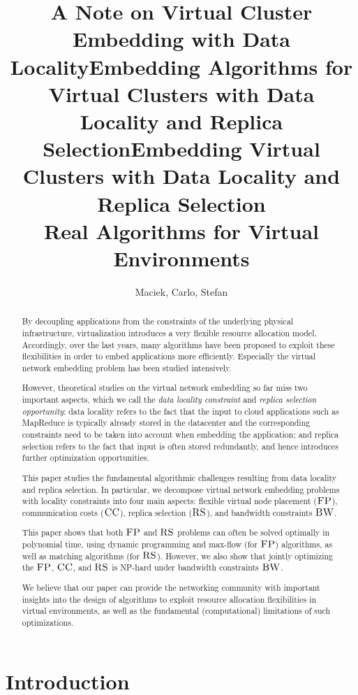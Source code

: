 \documentclass[9pt,twocolumn]{scrartcl}
\title{A Note on Virtual Cluster Embedding with Data Locality}
\title{Embedding Algorithms for Virtual Clusters with Data Locality and Replica Selection}
\title{Embedding Virtual Clusters with Data Locality and Replica Selection\\{\Large Real Algorithms for Virtual Environments}}
\author{Maciek, Carlo, Stefan}
\newcommand{\CC}{\textsc{CC}}
\newcommand{\FP}{\textsc{FP}}
\newcommand{\RS}{\textsc{RS}}
\newcommand{\BW}{\textsc{BW}}
\begin{document}
\maketitle


\begin{abstract}
By decoupling applications from the constraints of the underlying physical
infrastructure, virtualization introduces a very flexible resource allocation model.
Accordingly, over the last years, many algorithms have been proposed to exploit
these flexibilities in order to embed applications more efficiently. Especially the
virtual network embedding problem has been studied intensively.

However, theoretical studies on the virtual network embedding so far miss two important aspects,
which we call the \emph{data locality constraint} and \emph{replica selection opportunity}:
data locality refers to the fact that the input to cloud applications such as MapReduce
is typically already stored  in the datacenter and the corresponding constraints need to be taken into account when embedding
the application; and replica selection refers to the fact that input is often stored redundantly, and
hence introduces further optimization opportunities.

This paper studies the fundamental algorithmic challenges resulting from data locality
and replica selection.
In particular, we decompose virtual network embedding problems with locality constraints
into four
main aspects: flexible virtual node placement ($\FP$), communication costs ($\CC$),
replica selection ($\RS$),
and bandwidth constraints $\BW$.

This paper shows that both $\FP$ and $\RS$ problems can often be solved optimally in polynomial time,
using dynamic programming and max-flow (for $\FP$) algorithms, as well as matching algorithms (for $\RS$).
However, we also show that jointly optimizing the $\FP$, $\CC$,
and $\RS$ is NP-hard under bandwidth constraints $\BW$.

We believe that our paper can provide the networking community with important insights into the
design of algorithms to exploit resource allocation flexibilities in virtual environments, as well as the fundamental (computational)
limitations of such optimizations.
\end{abstract}

\section{Introduction}
\end{document}
